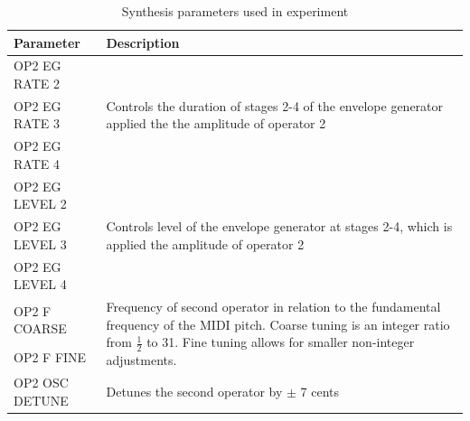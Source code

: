 \begin{table}[ht]
\centering
\caption{Synthesis parameters used in experiment}
\label{tbl:dexed-params}
\begin{tabular}{l|l}
\toprule
Parameter     & Description                                                                                  \\
\midrule
OP2 EG RATE 2 & \multirow{3}{*}{\parbox{0.70\linewidth}{Controls the duration of stages 2-4 of the envelope generator applied the the amplitude of operator 2}} \\
OP2 EG RATE 3 \\
OP2 EG RATE 4 \\
\midrule
OP2 EG LEVEL 2 & \multirow{3}{*}{\parbox{0.6\linewidth}{Controls level of the envelope generator at stages 2-4, which is applied the amplitude of operator 2}} \\
OP2 EG LEVEL 3 \\
OP2 EG LEVEL 4 \\
\midrule
OP2 F COARSE & \multirow{2}{*}{\parbox{0.6\linewidth}{Frequency of second operator in relation to the fundamental frequency of the MIDI pitch. Coarse tuning is an integer ratio from $\frac{1}{2}$ to 31. Fine tuning allows for smaller non-integer adjustments.}} \\[2.75ex]
OP2 F FINE \\[2.75ex]
\midrule
OP2 OSC DETUNE & \multirow{1}{*}{\parbox{0.6\linewidth}{Detunes the second operator by $\pm$ 7 cents}}\\
\bottomrule                                                                                             
\end{tabular}
\end{table}

